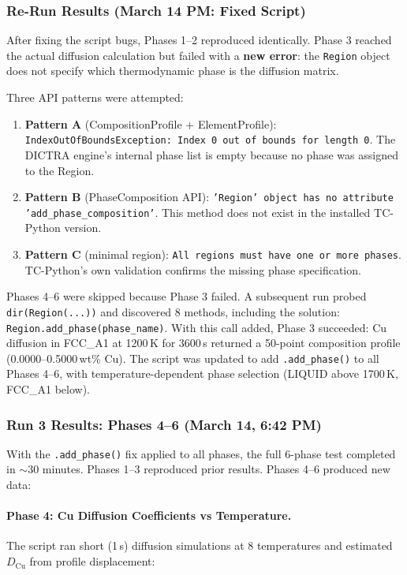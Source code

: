 \documentclass[11pt]{article}
\begin{document}
\subsubsection{Re-Run Results (March 14 PM: Fixed Script)}

After fixing the script bugs, Phases 1--2 reproduced identically. Phase 3 reached the actual diffusion calculation but failed with a \textbf{new error}: the \texttt{Region} object does not specify which thermodynamic phase is the diffusion matrix.

Three API patterns were attempted:
\begin{enumerate}[leftmargin=*]
    \item \textbf{Pattern A} (CompositionProfile + ElementProfile): \texttt{IndexOutOfBoundsException: Index 0 out of bounds for length 0}. The DICTRA engine's internal phase list is empty because no phase was assigned to the Region.
    \item \textbf{Pattern B} (PhaseComposition API): \texttt{'Region' object has no attribute 'add\_phase\_composition'}. This method does not exist in the installed TC-Python version.
    \item \textbf{Pattern C} (minimal region): \texttt{All regions must have one or more phases}. TC-Python's own validation confirms the missing phase specification.
\end{enumerate}

Phases 4--6 were skipped because Phase 3 failed. A subsequent run probed \texttt{dir(Region(...))} and discovered 8 methods, including the solution: \texttt{Region.add\_phase(phase\_name)}. With this call added, Phase 3 succeeded: Cu diffusion in FCC\_A1 at 1200\,K for 3600\,s returned a 50-point composition profile (0.0000--0.5000\,wt\% Cu). The script was updated to add \texttt{.add\_phase()} to all Phases 4--6, with temperature-dependent phase selection (LIQUID above 1700\,K, FCC\_A1 below).

\subsubsection{Run 3 Results: Phases 4--6 (March 14, 6:42 PM)}

With the \texttt{.add\_phase()} fix applied to all phases, the full 6-phase test completed in $\sim$30 minutes. Phases 1--3 reproduced prior results. Phases 4--6 produced new data:

\paragraph{Phase 4: Cu Diffusion Coefficients vs Temperature.}
The script ran short (1\,s) diffusion simulations at 8 temperatures and estimated $D_{\text{Cu}}$ from profile displacement:
\end{document}
